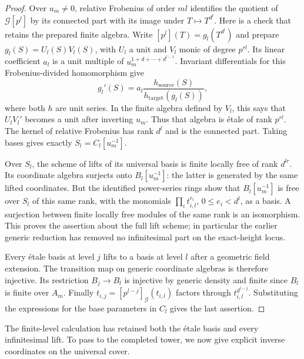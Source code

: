 \begin{proof}
Over $u_m\ne0$, relative Frobenius of order $ml$ identifies the
quotient of $\mathcal G[p^l]$ by its connected part with its image
under $T\mapsto T^{d^l}$.  Here is a check that retains the
prepared finite algebra.  Write $[p^l](T)=g_l(T^{d^l})$ and
prepare $g_l(S)=U_l(S)V_l(S)$, with $U_l$ a unit and $V_l$
monic of degree $p^{rl}$.  Its linear coefficient $a_l$ is a
unit multiple of $u_m^{1+d+\cdots+d^{l-1}}$.  Invariant
differentials for this Frobenius-divided homomorphism give
\[
 g_l'(S)=a_l\frac{h_{\mathrm{source}}(S)}
                         {h_{\mathrm{target}}(g_l(S))},
\]
where both $h$ are unit series.  In the finite algebra defined
by $V_l$, this says that $U_lV_l'$ becomes a unit after
inverting $u_m$.  Thus that algebra is \'etale of rank
$p^{rl}$.  The kernel of relative Frobenius has rank $d^l$
and is the connected part.  Taking bases gives exactly
$S_l=C_l[u_m^{-1}]$.

Over $S_l$, the scheme of lifts of its universal basis is
finite locally free of rank $d^{lr}$.  Its coordinate algebra
surjects onto $B_l[u_m^{-1}]$: the latter is generated by the
same lifted coordinates.  But the identified power-series
rings show that $B_l[u_m^{-1}]$ is free over $S_l$ of this
same rank, with the monomials $\prod_i t_{i,l}^{e_i}$,
$0\leq e_i<d^l$, as a basis.  A surjection between finite
locally free modules of the same rank is an isomorphism.
This proves the assertion about the full lift scheme; in
particular the earlier generic reduction has removed no
infinitesimal part on the exact-height locus.

Every \'etale basis at level $j$ lifts to a basis at level $l$ after a
geometric field extension.  The transition map on generic coordinate
algebras is therefore injective.  Its restriction $B_j\to B_l$ is
injective by generic density and finite since $B_l$ is finite over
$A_m$.  Finally
$t_{i,j}=[p^{l-j}]_{\mathcal G}(t_{i,l})$ factors through
$t_{i,l}^{d^{l-j}}$.  Substituting the expressions for the base
parameters in $C_l$ gives the last assertion.
\end{proof}

The finite-level calculation has retained both the \'etale basis and
every infinitesimal lift.  To pass to the completed tower, we now give
explicit inverse coordinates on the universal cover.

